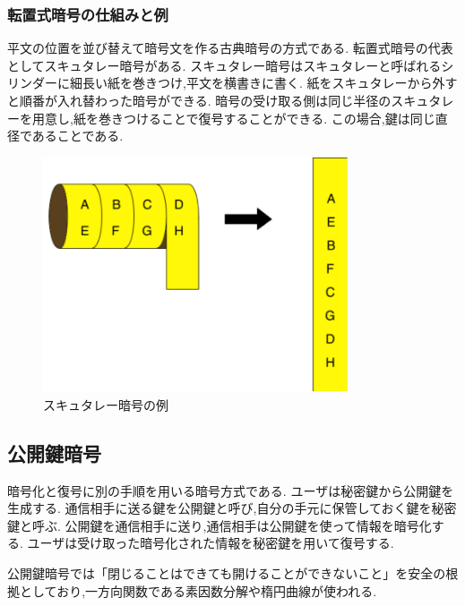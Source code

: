 \documentclass[a4j,12pt]{jsarticle}
\begin{document}
\subsubsection{転置式暗号の仕組みと例}
平文の位置を並び替えて暗号文を作る古典暗号の方式である.
転置式暗号の代表としてスキュタレー暗号がある.
スキュタレー暗号はスキュタレーと呼ばれるシリンダーに細長い紙を巻きつけ,平文を横書きに書く.
紙をスキュタレーから外すと順番が入れ替わった暗号ができる.
暗号の受け取る側は同じ半径のスキュタレーを用意し,紙を巻きつけることで復号することができる.
この場合,鍵は同じ直径であることである.

\begin{figure}[H]
\centering
\includegraphics[width=9cm]{062.pdf}
\caption{スキュタレー暗号の例}
\label{fig:06}
\end{figure} 



\subsection{公開鍵暗号}

暗号化と復号に別の手順を用いる暗号方式である.
ユーザは秘密鍵から公開鍵を生成する.
通信相手に送る鍵を公開鍵と呼び,自分の手元に保管しておく鍵を秘密鍵と呼ぶ.
公開鍵を通信相手に送り,通信相手は公開鍵を使って情報を暗号化する.
ユーザは受け取った暗号化された情報を秘密鍵を用いて復号する.

公開鍵暗号では「閉じることはできても開けることができないこと」を安全の根拠としており,一方向関数である素因数分解や楕円曲線が使われる.
\end{document}

